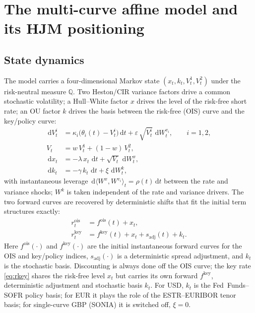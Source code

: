 \documentclass[11pt]{article}
\newcommand{\Qmeas}{\mathbb{Q}}
\newcommand{\ois}{\mathrm{ois}}
\newcommand{\key}{\mathrm{key}}
\newcommand{\dd}{\,\mathrm{d}}
\theoremstyle{plain}
\theoremstyle{definition}
\begin{document}
\section{The multi-curve affine model and its HJM positioning}

\subsection{State dynamics}

The model carries a four-dimensional Markov state $(x_t, k_t, V^1_t, V^2_t)$
under the risk-neutral measure $\Qmeas$. Two Heston/CIR variance factors drive
a common stochastic volatility; a Hull--White factor $x$ drives the level of the
risk-free short rate; an OU factor $k$ drives the basis between the risk-free
(OIS) curve and the key/policy curve:
\begin{align}
\dd V^i_t &= \kappa_i\bigl(\theta_i(t) - V^i_t\bigr)\dd t
             + \varepsilon\,\sqrt{V^i_t}\,\dd W^{v_i}_t, \qquad i = 1,2,
             \label{eq:cir}\\
V_t &= w\,V^1_t + (1-w)\,V^2_t, \label{eq:varmix}\\
\dd x_t &= -\lambda\,x_t\,\dd t + \sqrt{V_t}\,\dd W^{x}_t, \label{eq:hw}\\
\dd k_t &= -\gamma\,k_t\,\dd t + \xi\,\dd W^{k}_t, \label{eq:ou}
\end{align}
with instantaneous leverage $\dd\langle W^{x}, W^{v_i}\rangle_t = \rho(t)\dd t$
between the rate and variance shocks; $W^{k}$ is taken independent of the rate
and variance drivers. The two forward curves are recovered by deterministic
shifts that fit the initial term structures exactly:
\begin{align}
r^{\ois}_t &= f^{\ois}(t) + x_t, \label{eq:rois}\\
r^{\key}_t &= f^{\key}(t) + x_t + s_{\mathrm{adj}}(t) + k_t. \label{eq:rkey}
\end{align}
Here $f^{\ois}(\cdot)$ and $f^{\key}(\cdot)$ are the initial instantaneous
forward curves for the OIS and key/policy indices, $s_{\mathrm{adj}}(\cdot)$ is a
deterministic spread adjustment, and $k_t$ is the stochastic basis. Discounting
is always done off the OIS curve; the key rate \eqref{eq:rkey} shares the
risk-free level $x_t$ but carries its own forward $f^{\key}$, deterministic
adjustment and stochastic basis $k_t$. For USD, $k_t$ is the Fed~Funds--SOFR
policy basis; for EUR it plays the role of the ESTR--EURIBOR tenor basis; for
single-curve GBP (SONIA) it is switched off, $\xi = 0$.
\end{document}
